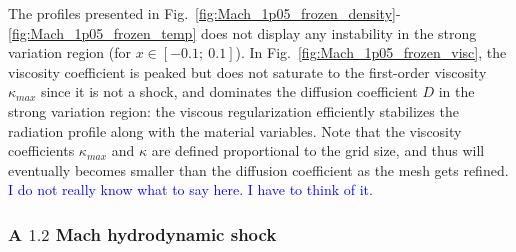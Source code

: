 \documentclass[review]{elsarticle}
\newcommand{\fig}[1]{Fig.~\ref{#1}}                      %
\newcommand{\tcb}[1]{\textcolor{blue}{#1}}
\begin{document}
%
The profiles presented in \fig{fig:Mach_1p05_frozen_density}-\ref{fig:Mach_1p05_frozen_temp} does not display any instability in the strong variation region (for $x \in \left[ -0.1;\  0.1 \right]$). In \fig{fig:Mach_1p05_frozen_visc}, the viscosity coefficient is peaked but does not saturate to the first-order viscosity $\kappa_{max}$ since it is not a shock, and dominates the diffusion coefficient $D$ in the strong variation region: the viscous regularization efficiently stabilizes the radiation profile along with the material variables. Note that the viscosity coefficients $\kappa_{max}$ and $\kappa$ are defined proportional to the grid size, and thus will eventually becomes smaller than the diffusion coefficient as the mesh gets refined. \tcb{ I do not really know what to say here. I have to think of it.}
\subsubsection{A $1.2$ Mach hydrodynamic shock}
\end{document}
